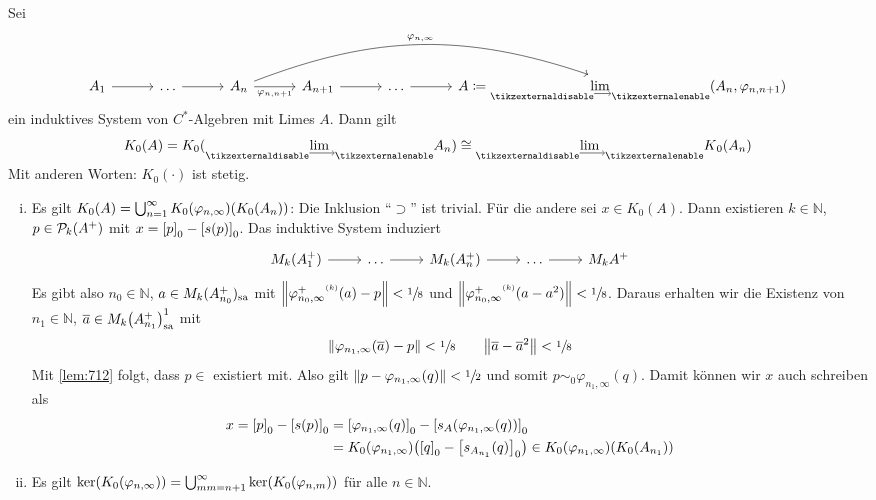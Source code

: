 \begin{satz}[label=satz:713]
	Sei 
	\[
		\begin{tikzcd}[sep=3em]
			A_1 \rar & \ldots \rar & A_n \rar["\varphi_{n,n+1}"'] \ar[rrr,bend left=20,"\varphi_{n,\infty}"] & A_{n+1} \rar & \ldots  \rar & A \coloneqq \Dlim (A_n,\varphi_{n,n+1}) 
		\end{tikzcd}
	\]
	ein induktives System von $C^*$-Algebren mit Limes $A$.
	Dann gilt
	\[
		K_0(A) = K_0(\Dlim A_n) \cong \Dlim K_0(A_n)
	\]
	Mit anderen Worten: $K_0(\cdot)$ ist stetig.
\end{satz}
\begin{beweis}
	\begin{enumerate}[(i)]
		\item Es gilt $K_0(A) = \bigcup_{n=1}^\infty K_0(\varphi_{n,\infty}) \enbrace*{K_0(A_n)}$:
		Die Inklusion \enquote{$\supset$} ist trivial.
		Für die andere sei $x \in K_0(A)$.
		Dann existieren $k \in \mathbb{N}$, $p \in \kernedP_k(A^+)$ mit $x = \benbrace*{p}_0 - \benbrace*{s(p)}_0$.
		Das induktive System induziert
		\[
			\begin{tikzcd}
				M_k(A_1^+) \rar & \ldots \rar & M_k(A_n^+) \rar & \ldots  \rar & M_k{A^+}
			\end{tikzcd}
		\]
		Es gibt also $n_0 \in \mathbb{N}$, $a \in M_k(A^+_{n_0})_\sa$ mit $\norm*{{\varphi_{n_0, \infty}^+}^\ssbrace{k}(a)  -p } < \sfrac{1}{8}$ und $\norm*{{\varphi_{n_0, \infty}^+}^\ssbrace{k}(a -a^2)} < \sfrac{1}{8}$.
		Daraus erhalten wir die Existenz von $n_1 \in \mathbb{N}$, $\overline{a} \in M_k \enbrace*{A_{n_1}^+}_\sa^1$ mit 
		\[
			\norm*{\varphi_{n_1,\infty}(\overline{a}) -p} < \sfrac{1}{8} \qquad \norm*{\overline{a} - \overline{a}^2} < \sfrac{1}{8}
		\]
		Mit \autoref{lem:712} folgt, dass $p \in $ existiert mit.
		Also gilt $\norm*{p - \varphi_{n_1,\infty}(q)} < \sfrac{1}{2}$ und somit $p \sim_0 \varphi_{n_1,\infty}(q)$.
		Damit können wir $x$ auch schreiben als
		\begin{align}
			x = \benbrace*{p}_0 - \benbrace*{s(p)}_0 &= \benbrace*{\varphi_{n_1,\infty}(q)}_0 - \benbrace*{s_A \enbrace*{ \varphi_{n_1,\infty}(q)}}_0 \\
			&= K_0 \enbrace*{\varphi_{n_1,\infty}} \enbrace*{\benbrace*{q}_0 - \benbrace[\big]{s_{A_{n_1}}(q)}_0} \in K_0(\varphi_{n_1,\infty}) \enbrace*{K_0(A_{n_1})}
		\end{align}
		\item Es gilt $\ker \enbrace*{K_0(\varphi_{n,\infty})} = \bigcup_{mm=n+1}^\infty \ker \enbrace*{K_0(\varphi_{n,m})}$ für alle $n \in \mathbb{N}$.
		

\end{enumerate}
\end{beweis}
